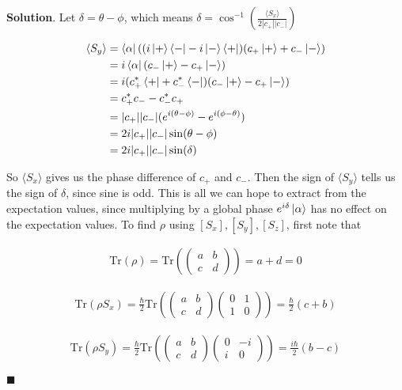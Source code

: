 \documentclass[12pt]{article}
\theoremstyle{definition}
\newenvironment{s}{%
        \begin{trivlist} \item \textbf{Solution}. }{%
            \hspace*{\fill} $\blacksquare$\end{trivlist}}%
\begin{document}
{\begin{s}
Let $\delta = \theta-\phi$, which means $\delta = \cos^{-1}\left(\frac{\langle S_{x}\rangle}{2|c_{+}||c_{-}|}\right)$

\begin{align*}
\langle S_{y}\rangle &= \bra{\alpha}((i\ket{+}\bra{-}-i\ket{-}\bra{+})(c_{+}\ket{+} + c_{-}\ket{-})\\
&= i\bra{\alpha}(c_{-}\ket{+} - c_{+}\ket{-})\\
&= i(c_{+}^{*}\bra{+} + c_{-}^{*}\bra{-})(c_{-}\ket{+} - c_{+}\ket{-})\\
&= c_{+}^{*}c_{-} - c_{-}^{*}c_{+}\\
&= |c_{+}||c_{-}|(e^{i(\theta-\phi)} - e^{i(\phi-\theta)})\\
&= 2i|c_{+}||c_{-}|\sin(\theta-\phi)\\
&= 2i|c_{+}||c_{-}|\sin(\delta)
\end{align*}

So $\langle S_{x}\rangle$ gives us the phase difference of $c_{+}$ and $c_{-}$. Then the sign of $\langle S_{y} \rangle$ tells us the sign of $\delta$, since sine is odd. This is all we can hope to extract from the expectation values, since multiplying by a global phase $e^{i\delta}\ket{\alpha}$ has no effect on the expectation values. To find $\rho$ using $[S_{x}],[S_{y}],[S_{z}]$, first note that

\begin{align*}
\mathrm{Tr}(\rho) = 
\mathrm{Tr}\left(\begin{pmatrix}a&b\\c&d\end{pmatrix}\right) = a+d = 0
\end{align*}

\begin{align*}
\mathrm{Tr}\left(\rho S_{x}\right) = 
\frac{\hbar}{2}\mathrm{Tr}\left(\begin{pmatrix}a&b\\c&d\end{pmatrix}\begin{pmatrix}0&1\\1&0\end{pmatrix}\right) = \frac{\hbar}{2}(c + b)
\end{align*}


\begin{align*}
\mathrm{Tr}\left(\rho S_{y}\right) = 
\frac{\hbar}{2}\mathrm{Tr}\left(\begin{pmatrix}a&b\\c&d\end{pmatrix}\begin{pmatrix}0&-i\\i&0\end{pmatrix}\right) = \frac{i\hbar}{2}(b-c)
\end{align*}



\end{s}}
\end{document}

